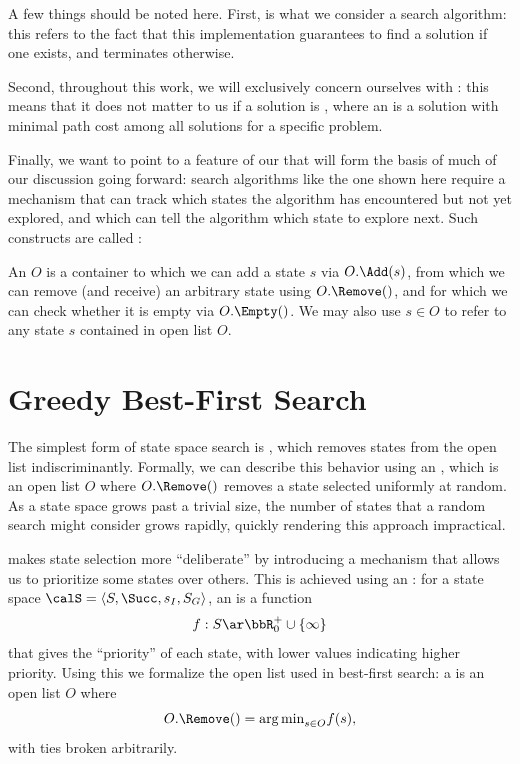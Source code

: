 A few things should be noted here. First,  is what we consider a  search algorithm: this refers to the fact that this implementation guarantees to find a solution if one exists, and terminates otherwise.

Second, throughout this work, we will exclusively concern ourselves with : this means that it does not matter to us if a solution is , where an  is a solution with minimal path cost among all solutions for a specific problem.

Finally, we want to point to a feature of our  that will form the basis of much of our discussion going forward: search algorithms like the one shown here require a mechanism that can track which states the algorithm has encountered but not yet explored, and which can tell the algorithm which state to explore next. Such constructs are called :

An  $O$ is a container to which we can add a state $s$ via $O.\Add(s)$, from which we can remove (and receive) an arbitrary state using $O.\Remove()$, and for which we can check whether it is empty via $O.\Empty()$. We may also use $s\in O$ to refer to any state $s$ contained in open list $O$.


\section{Greedy Best-First Search}
\label{sec:gbfs}

The simplest form of state space search is , which removes states from the open list indiscriminantly. Formally, we can describe this behavior using an , which is an open list $O$ where $O.\Remove()$ removes a state selected uniformly at random. As a state space grows past a trivial size, the number of states that a random search might consider grows rapidly, quickly rendering this approach impractical.

 makes state selection more ``deliberate'' by introducing a mechanism that allows us to prioritize some states over others. This is achieved using an : for a state space $\calS=\langle S,\Succ,s_I,S_G\rangle$, an  is a function $$f:S\ar\bbR_0^+\cup\{\infty\}$$ that gives the ``priority'' of each state, with lower values indicating higher priority. Using this we formalize the open list used in best-first search: a  is an open list $O$ where $$O.\Remove()={\arg\min}_{s\in O}f(s),$$ with ties broken arbitrarily.

